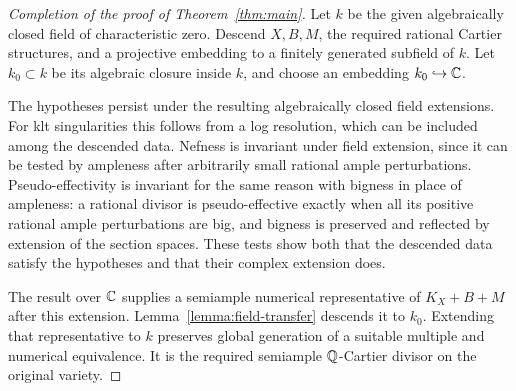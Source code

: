 \begin{proof}[Completion of the proof of Theorem~\ref{thm:main}]
Let $k$ be the given algebraically closed field of characteristic
zero.  Descend $X,B,M$, the required rational Cartier structures,
and a projective embedding to a finitely generated subfield of $k$.
Let $k_0\subset k$ be its algebraic closure inside $k$, and choose
an embedding $k_0\hookrightarrow\mathbb C$.

The hypotheses persist under the resulting algebraically closed
field extensions.  For klt singularities this follows from a log
resolution, which can be included among the descended data.
Nefness is invariant under field extension, since it can be tested
by ampleness after arbitrarily small rational ample perturbations.
Pseudo-effectivity is invariant for the same reason with bigness
in place of ampleness: a rational divisor is pseudo-effective
exactly when all its positive rational ample perturbations are
big, and bigness is preserved and reflected by extension of the
section spaces.  These tests show both that the descended data
satisfy the hypotheses and that their complex extension does.

The result over $\mathbb C$ supplies a semiample numerical representative
of $K_X+B+M$ after this extension.  Lemma~\ref{lemma:field-transfer}
descends it to $k_0$.  Extending that representative to $k$ preserves
global generation of a suitable multiple and numerical
equivalence.  It is the required semiample $\mathbb Q$-Cartier divisor
on the original variety.
\end{proof}

